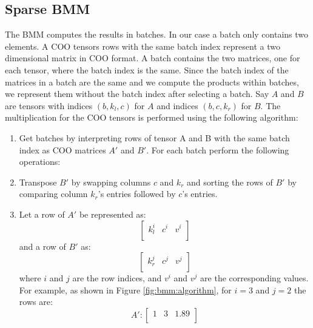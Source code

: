 \subsection{Sparse BMM}
The BMM computes the results in batches. In our case a batch only contains two elements. A COO tensors
rows with the same batch index represent a two dimensional matrix in COO format. A batch contains
the two matrices, one for each tensor, where the batch index is the same. Since the batch index of
the matrices in a batch are the same and we compute the products within batches, we represent them
without the batch index after selecting a batch. Say $A$ and $B$ are tensors with indices $(b, k_l, c)$
for $A$ and indices $(b, c, k_r)$ for $B$. The multiplication for the COO tensors is performed
using the following algorithm:

\begin{enumerate}[label*=\arabic*.]
    \item Get batches by interpreting rows of tensor A and B with the same batch index as COO matrices
          $A'$ and $B'$. For each batch perform the following operations:
    \item Transpose $B'$ by swapping columns $c$ and $k_r$ and sorting the rows of $B'$ by comparing
          column $k_r$'s entries followed by $c$'s entries.
    \item Let a row of $A'$ be represented as:
          \begin{equation*}
              \begin{bmatrix}
                  k_l^i & c^i & v^i \\
              \end{bmatrix}
          \end{equation*}
          and a row of $B'$ as:
          \begin{equation*}
              \begin{bmatrix}
                  k_r^j & c^j & v^j \\
              \end{bmatrix}
          \end{equation*}
          where $i$ and $j$ are the row indices, and $v^i$ and $v^j$ are the corresponding values.
          For example, as shown in Figure \ref{fig:bmm:algorithm}, for $i=3$ and $j=2$ the rows are:
          \begin{equation*}
              A':
              \begin{bmatrix}
                  1 & 3 & 1.89 \\
              \end{bmatrix}

\end{equation*}
\end{enumerate}

